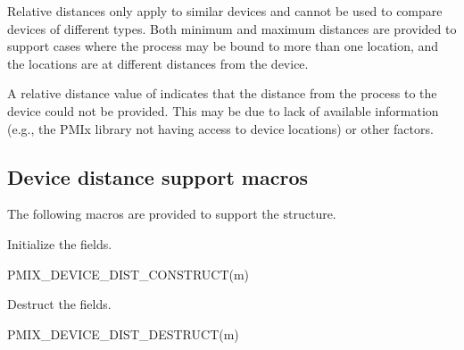 Relative distances only apply to similar devices and cannot be used to compare devices of different types. Both minimum and maximum distances are provided to support cases where the process may be bound to more than one location, and the locations are at different distances from the device.

A relative distance value of  indicates that the distance from the process to the device could not be provided. This may be due to lack of available information (e.g., the \ac{PMIx} library not having access to device locations) or other factors.


\subsection{Device distance support macros}
\label{api:netenddist:macros}

The following macros are provided to support the  structure.


Initialize the  fields.

\cspecificstart
\begin{codepar}
PMIX_DEVICE_DIST_CONSTRUCT(m)
\end{codepar}
\cspecificend

\begin{arglist}
\end{arglist}


Destruct the  fields.

\cspecificstart
\begin{codepar}
PMIX_DEVICE_DIST_DESTRUCT(m)
\end{codepar}
\cspecificend

\begin{arglist}
\end{arglist}


